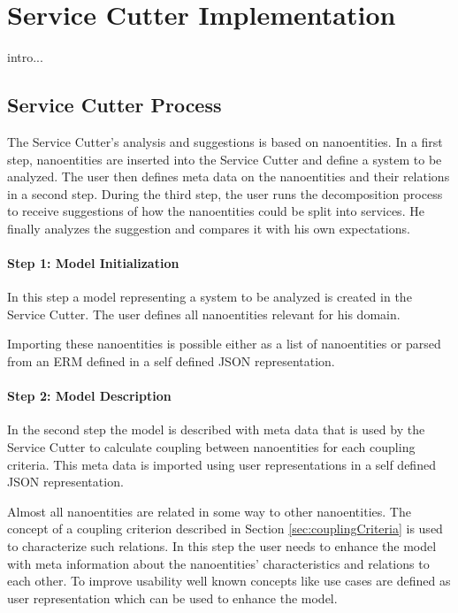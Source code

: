 
\chapter{Service Cutter Implementation}
\label{cha:implementation}

intro... %


\section{Service Cutter Process}

The Service Cutter's analysis and suggestions is based on nanoentities. In a first step, nanoentities are inserted into the Service Cutter and define a system to be analyzed. The user then defines meta data on the nanoentities and their relations in a second step. During the third step, the user runs the decomposition process to receive suggestions of how the nanoentities could be split into services. He finally analyzes the suggestion and compares it with his own expectations. 

\subsubsection{Step 1: Model Initialization}

In this step a model representing a system to be analyzed is created in the Service Cutter. The user defines all nanoentities relevant for his domain. 

Importing these nanoentities is possible either as a list of nanoentities or parsed from an \gls{ERM} defined in a self defined JSON representation.


\subsubsection{Step 2: Model Description}

In the second step the model is described with meta data that is used by the Service Cutter to calculate coupling between nanoentities for each coupling criteria. This meta data is imported using user representations in a self defined JSON representation.


Almost all nanoentities are related in some way to other nanoentities. The concept of a coupling criterion described in Section \ref{sec:couplingCriteria} is used to characterize such relations. In this step the user needs to enhance the model with meta information about the nanoentities' characteristics and relations to each other. To improve usability well known concepts like use cases are defined as user representation which can be used to enhance the model. 

